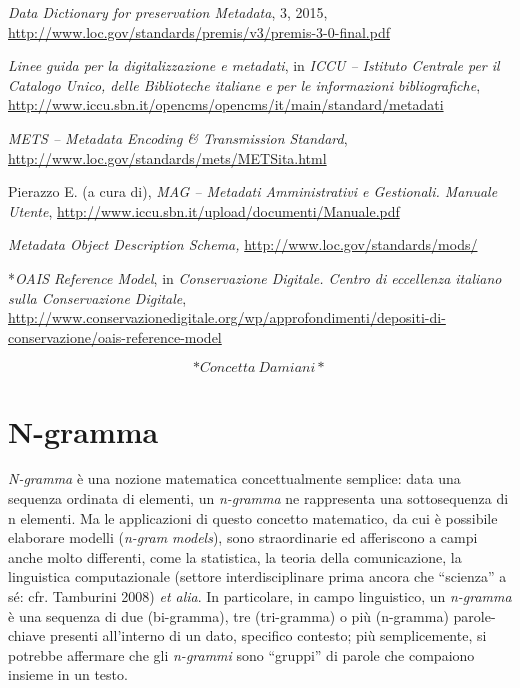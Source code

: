 \documentclass[
  b5paper,
  twoside,
  12pt,
  chapterprefix=false,
  bibliography=totocnumbered,
  parskip=false]{scrbook}
\begin{document}
\emph{Data Dictionary for preservation Metadata}, 3, 2015,
\url{http://www.loc.gov/standards/premis/v3/premis-3-0-final.pdf}

\emph{Linee guida per la digitalizzazione e metadati}, in \emph{ICCU -- Istituto
Centrale per il Catalogo Unico, delle Biblioteche italiane e per le
informazioni bibliografiche},
\url{http://www.iccu.sbn.it/opencms/opencms/it/main/standard/metadati}

\emph{METS -- Metadata Encoding \& Transmission Standard},
\url{http://www.loc.gov/standards/mets/METSita.html}

Pierazzo E. (a cura di), \emph{MAG -- Metadati Amministrativi e Gestionali.
Manuale Utente},
\url{http://www.iccu.sbn.it/upload/documenti/Manuale.pdf}

\emph{Metadata Object Description Schema,}
\url{http://www.loc.gov/standards/mods/}

*\emph{OAIS Reference Model}, in \emph{Conservazione Digitale. Centro di
eccellenza italiano sulla Conservazione Digitale},
\url{http://www.conservazionedigitale.org/wp/approfondimenti/depositi-di-conservazione/oais-reference-model}

\[*Concetta~Damiani*\]

\hypertarget{n-gramma}{%
\chapter{N-gramma}\label{n-gramma}}

\emph{N-gramma} è una nozione matematica concettualmente semplice: data una
sequenza ordinata di elementi, un \emph{n-gramma} ne rappresenta una
sottosequenza di n elementi. Ma le applicazioni di questo concetto
matematico, da cui è possibile elaborare modelli (\emph{n-gram models}), sono
straordinarie ed afferiscono a campi anche molto differenti, come la
statistica, la teoria della comunicazione, la linguistica computazionale
(settore interdisciplinare prima ancora che \enquote{scienza} a sé: cfr.
Tamburini 2008) \emph{et alia}. In particolare, in campo linguistico, un
\emph{n-gramma} è una sequenza di due (bi-gramma), tre (tri-gramma) o più
(n-gramma) parole-chiave presenti all'interno di un dato, specifico
contesto; più semplicemente, si potrebbe affermare che gli \emph{n-grammi}
sono \enquote{gruppi} di parole che compaiono insieme in un testo.
\end{document}
